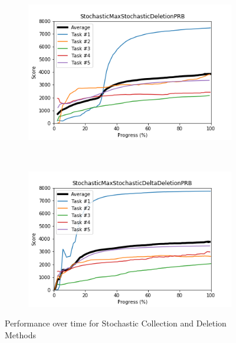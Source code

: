 \documentclass{article} %
\begin{document}
\begin{figure}[!ht]
    \begin{subfigure}[t]{0.5\textwidth}
        \centering
        \includegraphics[width=\textwidth]{images/StochasticMaxStochasticDeletionPRB.png}
    \end{subfigure}%
    ~
    \begin{subfigure}[t]{0.5\textwidth}
        \centering
        \includegraphics[width=\textwidth]{images/StochasticMaxStochasticDeltaDeletionPRB.png}
    \end{subfigure}%
    \caption{Performance over time for Stochastic Collection and Deletion Methods}
    \label{fig:combined_performance}
 
\end{figure}
\end{document}
